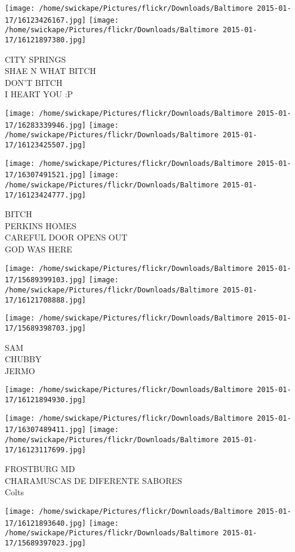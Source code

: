 \documentclass[10pt,letterpaper]{article}
\begin{document}
\texttt{[image: /home/swickape/Pictures/flickr/Downloads/Baltimore 2015-01-17/16123426167.jpg]}
\texttt{[image: /home/swickape/Pictures/flickr/Downloads/Baltimore 2015-01-17/16121897380.jpg]}

CITY SPRINGS\\
SHAE N WHAT BITCH\\
DON'T BITCH\\
I HEART YOU :P
\pagebreak

\texttt{[image: /home/swickape/Pictures/flickr/Downloads/Baltimore 2015-01-17/16283339946.jpg]}
\texttt{[image: /home/swickape/Pictures/flickr/Downloads/Baltimore 2015-01-17/16123425507.jpg]}

\texttt{[image: /home/swickape/Pictures/flickr/Downloads/Baltimore 2015-01-17/16307491521.jpg]}
\texttt{[image: /home/swickape/Pictures/flickr/Downloads/Baltimore 2015-01-17/16123424777.jpg]}

BITCH\\
PERKINS HOMES\\
CAREFUL DOOR OPENS OUT\\
GOD WAS HERE
\pagebreak

\texttt{[image: /home/swickape/Pictures/flickr/Downloads/Baltimore 2015-01-17/15689399103.jpg]}
\texttt{[image: /home/swickape/Pictures/flickr/Downloads/Baltimore 2015-01-17/16121708888.jpg]}

\texttt{[image: /home/swickape/Pictures/flickr/Downloads/Baltimore 2015-01-17/15689398703.jpg]}

SAM\\
CHUBBY\\
JERMO
\pagebreak

\texttt{[image: /home/swickape/Pictures/flickr/Downloads/Baltimore 2015-01-17/16121894930.jpg]}

\vspace{0.25in}
\texttt{[image: /home/swickape/Pictures/flickr/Downloads/Baltimore 2015-01-17/16307489411.jpg]}
\texttt{[image: /home/swickape/Pictures/flickr/Downloads/Baltimore 2015-01-17/16123117699.jpg]}

FROSTBURG MD\\
CHARAMUSCAS DE DIFERENTE SABORES\\
Colts
\pagebreak

\texttt{[image: /home/swickape/Pictures/flickr/Downloads/Baltimore 2015-01-17/16121893640.jpg]}
\texttt{[image: /home/swickape/Pictures/flickr/Downloads/Baltimore 2015-01-17/15689397023.jpg]}
\end{document}
